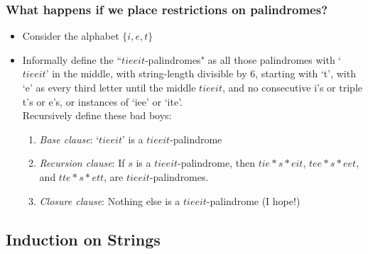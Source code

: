 \begin{frame}
\frametitle{What happens if we place restrictions on palindromes?}

\begin{itemize}[<+->]


\item Consider the alphabet $\{i, e, t\}$

\item Informally define the ``$tieeit$-palindromes" as all those palindromes with `$tieeit$' in the middle, with string-length divisible by 6, starting with `t', with `e' as every third letter until the middle $tieeit$, and no consecutive i's or triple t's or e's, or instances of `iee' or `ite'. \\ Recursively define these bad boys:


\begin{enumerate}
\item {\emph{Base clause}}: `$tieeit$' is a $tieeit$-palindrome

\item {\emph{Recursion clause}}: If $s$ is a $tieeit$-palindrome, then $tie*s*eit$, \phantom{vvvvv} $tee*s*eet$, and $tte*s*ett$, are $tieeit$-palindromes.


\item {\emph{Closure clause}}: Nothing else is a $tieeit$-palindrome (I hope!)
\end{enumerate}



\end{itemize}
\end{frame}


\subsection{Induction on Strings}

